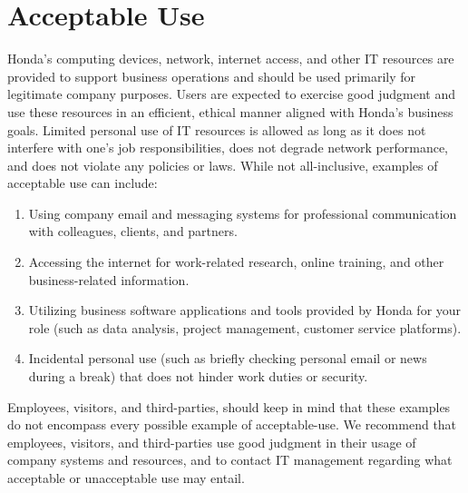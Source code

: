 \section{Acceptable Use}
Honda's computing devices, network, internet access, and other IT resources are provided to support business operations and should be used primarily for legitimate company purposes. Users are expected to exercise good judgment and use these resources in an efficient, ethical manner aligned with Honda's business goals. Limited personal use of IT resources is allowed as long as it does not interfere with one's job responsibilities, does not degrade network performance, and does not violate any policies or laws. While not all-inclusive, examples of acceptable use can include:
\begin{enumerate}
    \item Using company email and messaging systems for professional communication with colleagues, clients, and partners.
    \item Accessing the internet for work-related research, online training, and other business-related information.
    \item Utilizing business software applications and tools provided by Honda for your role (such as data analysis, project management, customer service platforms).
    \item Incidental personal use (such as briefly checking personal email or news during a break) that does not hinder work duties or security.
\end{enumerate}
Employees, visitors, and third-parties, should keep in mind that these examples do not encompass every possible example of acceptable-use. We recommend that employees, visitors, and third-parties use good judgment in their usage of company systems and resources, and to contact IT management regarding what acceptable or unacceptable use may entail.
